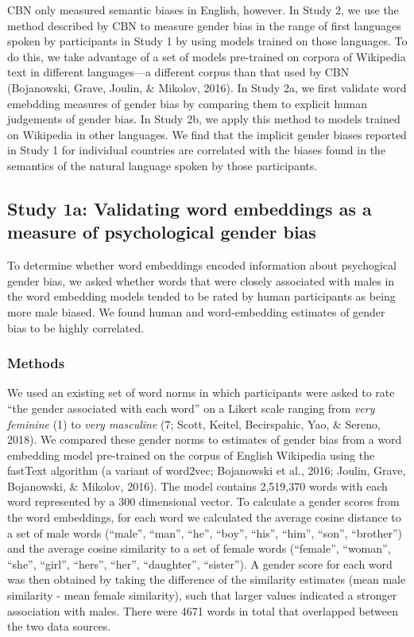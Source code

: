 \documentclass[man]{apa6}
\theoremstyle{definition}
\theoremstyle{definition}
\theoremstyle{definition}
\theoremstyle{remark}
\begin{document}
CBN only measured semantic biases in English, however. In Study 2, we
use the method described by CBN to measure gender bias in the range of
first languages spoken by participants in Study 1 by using models
trained on those languages. To do this, we take advantage of a set of
models pre-trained on corpora of Wikipedia text in different
languages---a different corpus than that used by CBN (Bojanowski, Grave,
Joulin, \& Mikolov, 2016). In Study 2a, we first validate word emebdding
measures of gender bias by comparing them to explicit human judgements
of gender bias. In Study 2b, we apply this method to models trained on
Wikipedia in other languages. We find that the implicit gender biases
reported in Study 1 for individual countries are correlated with the
biases found in the semantics of the natural language spoken by those
participants.

\subsection{Study 1a: Validating word embeddings as a measure of
psychological gender
bias}\label{study-1a-validating-word-embeddings-as-a-measure-of-psychological-gender-bias}

To determine whether word embeddings encoded information about
psychogical gender bias, we asked whether words that were closely
associated with males in the word embedding models tended to be rated by
human participants as being more male biased. We found human and
word-embedding estimates of gender bias to be highly correlated.

\subsubsection{Methods}\label{methods-1}

We used an existing set of word norms in which participants were asked
to rate \enquote{the gender associated with each word} on a Likert scale
ranging from \emph{very feminine} (1) to \emph{very masculine} (7;
Scott, Keitel, Becirspahic, Yao, \& Sereno, 2018). We compared these
gender norms to estimates of gender bias from a word embedding model
pre-trained on the corpus of English Wikipedia using the fastText
algorithm (a variant of word2vec; Bojanowski et al., 2016; Joulin,
Grave, Bojanowski, \& Mikolov, 2016). The model contains 2,519,370 words
with each word represented by a 300 dimensional vector. To calculate a
gender scores from the word embeddings, for each word we calculated the
average cosine distance to a set of male words (\enquote{male},
\enquote{man}, \enquote{he}, \enquote{boy}, \enquote{his},
\enquote{him}, \enquote{son}, \enquote{brother}) and the average cosine
similarity to a set of female words (\enquote{female}, \enquote{woman},
\enquote{she}, \enquote{girl}, \enquote{hers}, \enquote{her},
\enquote{daughter}, \enquote{sister}). A gender score for each word was
then obtained by taking the difference of the similarity estimates (mean
male similarity - mean female similarity), such that larger values
indicated a stronger association with males. There were 4671 words in
total that overlapped between the two data sources.
\end{document}
